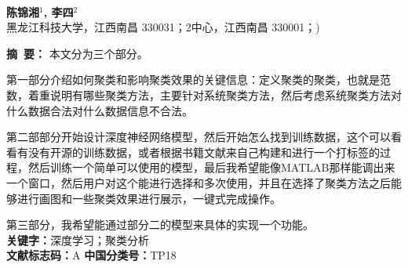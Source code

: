 \documentclass[a4paper,onecolumn,twoside]{article}
\begin{document}
  

    \thispagestyle{plain}
             \vspace{-3em}
            \begin{center}
              \parbox{\textwidth}{
                \begin{center}
                  {}\\
                \vspace{3pt}
                  \vspace{-0.0cm}
                \end{center}
                \begin{center}
                  \textbf{陈锦湘$^1$, 李四$^2$}\\[2pt]
                  \small{黑龙江科技大学，江西南昌 330031；2中心，江西南昌 330001；)}\\[2pt]
                \end{center}
                {\small{\textbf{摘~要：}
                		本文分为三个部分。
                		
                		第一部分介绍如何聚类和影响聚类效果的关键信息：定义聚类的聚类，也就是范数，着重说明有哪些聚类方法，主要针对系统聚类方法，然后考虑系统聚类方法对什么数据合法对什么数据信息不合法。
                		
                		第二部部分开始设计深度神经网络模型，然后开始怎么找到训练数据，这个可以看看有没有开源的训练数据，或者根据书籍文献来自己构建和进行一个打标签的过程，然后训练一个简单可以使用的模型，最后我希望能像MATLAB那样能调出来一个窗口，然后用户对这个能进行选择和多次使用，并且在选择了聚类方法之后能够进行画图和一些聚类效果进行展示，一键式完成操作。
                		
                		第三部分，我希望能通过部分二的模型来具体的实现一个功能。
                \\
                
                \textbf{关键字：}深度学习；聚类分析\\
                \textbf{文献标志码：}A \hspace{4cm} \textbf{中国分类号：}TP18
              }}

              }
            \end{center}
\end{document}

